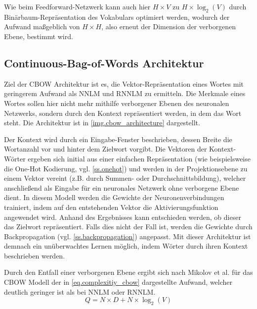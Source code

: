 Wie beim Feedforward-Netzwerk kann auch hier $H \times V$ zu $H \times \log_2(V)$ durch Binärbaum-Repräsentation des Vokabulars optimiert werden, wodurch der Aufwand maßgeblich von $H \times H$, also erneut der Dimension der verborgenen Ebene, bestimmt wird.


\subsection{Continuous-Bag-of-Words Architektur}\label{ss.cbow}
Ziel der CBOW Architektur ist es, die Vektor-Repräsentation eines Wortes mit geringerem Aufwand als NNLM und RNNLM zu ermitteln. Die Merkmale eines Wortes sollen hier nicht mehr mithilfe verborgener Ebenen des neuronalen Netzwerks, sondern durch den Kontext repräsentiert werden, in dem das Wort steht. Die Architektur ist in \autoref{img.cbow_architecture} dargestellt.


Der Kontext wird durch ein Eingabe-Fenster beschrieben, dessen Breite die Wortanzahl vor und hinter dem Zielwort vorgibt. Die Vektoren der Kontext-Wörter ergeben sich initial aus einer einfachen Repräsentation (wie beispielsweise die One-Hot Kodierung, vgl. \autoref{ss.onehot}) und werden in der Projektionsebene zu einem Vektor vereint (z.B. durch Summen- oder Durchschnittsbildung), welcher anschließend als Eingabe für ein neuronales Netzwerk ohne verborgene Ebene dient. In diesem Modell werden die Gewichte der Neuronenverbindungen trainiert, indem auf den entstehenden Vektor die Aktivierungsfunktion angewendet wird. Anhand des Ergebnisses kann entschieden werden, ob dieser das Zielwort repräsentiert. Falls dies nicht der Fall ist, werden die Gewichte durch Backpropagation (vgl. \autoref{ss.backpropagation}) angepasst. Mit dieser Architektur ist demnach ein unüberwachtes Lernen möglich, indem Wörter durch ihren Kontext beschrieben werden.


Durch den Entfall einer verborgenen Ebene ergibt sich nach Mikolov et al. für das CBOW Modell der in \autoref{eq.complexitiy_cbow} dargestellte Aufwand, welcher deutlich geringer ist als bei NNLM oder RNNLM.
\begin{equation}
    Q = N \times D + N \times \log_2(V) \label{eq.complexitiy_cbow}
\end{equation}


